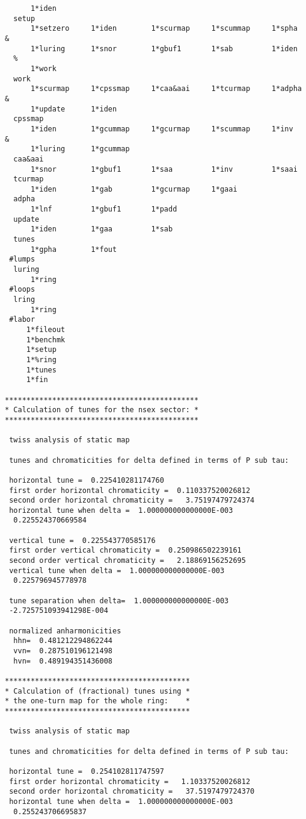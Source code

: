 \begin{footnotesize}
\begin{verbatim}
      1*iden
  setup
      1*setzero     1*iden        1*scurmap     1*scummap     1*spha     &
      1*luring      1*snor        1*gbuf1       1*sab         1*iden
  %
      1*work
  work
      1*scurmap     1*cpssmap     1*caa&aai     1*tcurmap     1*adpha    &
      1*update      1*iden
  cpssmap
      1*iden        1*gcummap     1*gcurmap     1*scummap     1*inv      &
      1*luring      1*gcummap
  caa&aai
      1*snor        1*gbuf1       1*saa         1*inv         1*saai
  tcurmap
      1*iden        1*gab         1*gcurmap     1*gaai
  adpha
      1*lnf         1*gbuf1       1*padd
  update
      1*iden        1*gaa         1*sab
  tunes
      1*gpha        1*fout
 #lumps
  luring
      1*ring
 #loops
  lring
      1*ring
 #labor
     1*fileout
     1*benchmk
     1*setup
     1*%ring
     1*tunes
     1*fin

*********************************************
* Calculation of tunes for the nsex sector: *
*********************************************

 twiss analysis of static map

 tunes and chromaticities for delta defined in terms of P sub tau:

 horizontal tune =  0.225410281174760
 first order horizontal chromaticity =  0.110337520026812
 second order horizontal chromaticity =   3.75197479724374
 horizontal tune when delta =  1.000000000000000E-003
  0.225524370669584

 vertical tune =  0.225543770585176
 first order vertical chromaticity =  0.250986502239161
 second order vertical chromaticity =   2.18869156252695
 vertical tune when delta =  1.000000000000000E-003
  0.225796945778978

 tune separation when delta=  1.000000000000000E-003
 -2.725751093941298E-004

 normalized anharmonicities
  hhn=  0.481212294862244
  vvn=  0.287510196121498
  hvn=  0.489194351436008

*******************************************
* Calculation of (fractional) tunes using *
* the one-turn map for the whole ring:    *
*******************************************

 twiss analysis of static map

 tunes and chromaticities for delta defined in terms of P sub tau:

 horizontal tune =  0.254102811747597
 first order horizontal chromaticity =   1.10337520026812
 second order horizontal chromaticity =   37.5197479724370
 horizontal tune when delta =  1.000000000000000E-003
  0.255243706695837


\end{verbatim}
\end{footnotesize}
